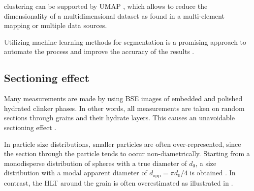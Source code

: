 {
\color{red}

clustering can be supported by \ac{UMAP} \cite{mcinnes.2018}, which allows to reduce the dimensionality of a multidimensional dataset as found in a multi-element mapping or multiple data sources.

Utilizing machine learning methods for segmentation is a promising approach to automate the process and improve the accuracy of the results \cite{}.
}

\FloatBarrier
\subsection{Sectioning effect}
\label{subsec:sectioning-effect}

Many measurements are made by using \ac{BSE} images of embedded and polished hydrated clinker phases.
In other words, all measurements are taken on random sections through grains and their hydrate layers.
This causes an unavoidable sectioning effect \cite{scrivener.2004}.

In particle size distributions, smaller particles are often over-represented, since the section through the particle tends to occur non-diametrically.
Starting from a monodisperse distribution of spheres with a true diameter of $d_0$, a size distribution with a modal apparent diameter of $d_\text{app} = \pi d_0  / 4$ is obtained \cite{cuzzi.2017}.
In contrast, the \ac{HLT} around the grain is often overestimated as illustrated in .

